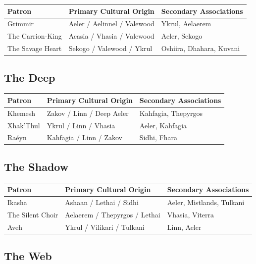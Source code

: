 \begin{longtable}{p{} p{} p{}}
\hline
\textbf{Patron} & \textbf{Primary Cultural Origin} & \textbf{Secondary Associations} \\
\hline
Grimmir & Aeler / Aelinnel / Valewood & Ykrul, Aelaerem \\
The Carrion-King & Acasia / Vhasia / Valewood & Aeler, Sekogo \\
The Savage Heart & Sekogo / Valewood / Ykrul & Oshiira, Dhahara, Kuvani \\
\hline
\end{longtable}

\subsection{The Deep}

\begin{longtable}{p{} p{} p{}}
\hline
\textbf{Patron} & \textbf{Primary Cultural Origin} & \textbf{Secondary Associations} \\
\hline
Khemesh & Zakov / Linn / Deep Aeler & Kahfagia, Thepyrgos \\
Xhak'Thul & Ykrul / Linn / Vhasia & Aeler, Kahfagia \\
Raéyn & Kahfagia / Linn / Zakov & Sidhi, Fhara \\
\hline
\end{longtable}

\subsection{The Shadow}

\begin{longtable}{p{} p{} p{}}
\hline
\textbf{Patron} & \textbf{Primary Cultural Origin} & \textbf{Secondary Associations} \\
\hline
Ikasha & Ashaan / Lethai / Sidhi & Aeler, Mistlands, Tulkani \\
The Silent Choir & Aelaerem / Thepyrgos / Lethai & Vhasia, Viterra \\
Aveh & Ykrul / Vilikari / Tulkani & Linn, Aeler \\
\hline
\end{longtable}

\subsection{The Web}

